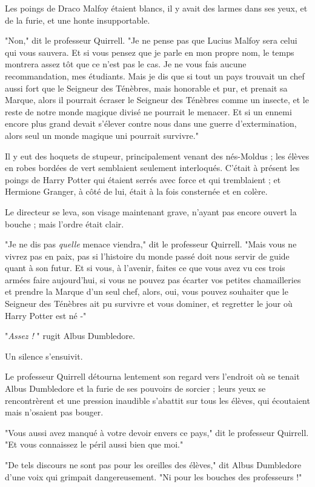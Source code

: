 Les poings de Draco Malfoy étaient blancs, il y avait des larmes dans ses yeux, et de la furie, et une honte insupportable.

"Non," dit le professeur Quirrell. "Je ne pense pas que Lucius Malfoy sera celui qui vous sauvera. Et si vous pensez que je parle en mon propre nom, le temps montrera assez tôt que ce n'est pas le cas. Je ne vous fais aucune recommandation, mes étudiants. Mais je dis que si tout un pays trouvait un chef aussi fort que le Seigneur des Ténèbres, mais honorable et pur, et prenait sa Marque, alors il pourrait écraser le Seigneur des Ténèbres comme un insecte, et le reste de notre monde magique divisé ne pourrait le menacer. Et si un ennemi encore plus grand devait s'élever contre nous dans une guerre d'extermination, alors seul un monde magique uni pourrait survivre."

Il y eut des hoquets de stupeur, principalement venant des nés-Moldus ; les élèves en robes bordées de vert semblaient seulement interloqués. C'était à présent les poings de Harry Potter qui étaient serrés avec force et qui tremblaient ; et Hermione Granger, à côté de lui, était à la fois consternée et en colère.

Le directeur se leva, son visage maintenant grave, n'ayant pas encore ouvert la bouche ; mais l'ordre était clair.

"Je ne dis pas \emph{quelle}  menace viendra," dit le professeur Quirrell. "Mais vous ne vivrez pas en paix, pas si l'histoire du monde passé doit nous servir de guide quant à son futur. Et si vous, à l'avenir, faites ce que vous avez vu ces trois armées faire aujourd'hui, si vous ne pouvez pas écarter vos petites chamailleries et prendre la Marque d'un seul chef, alors, oui, vous pouvez souhaiter que le Seigneur des Ténèbres ait pu survivre et vous dominer, et regretter le jour où Harry Potter est né -"

"\emph{Assez !} " rugit Albus Dumbledore.

Un silence s'ensuivit.

Le professeur Quirrell détourna lentement son regard vers l'endroit où se tenait Albus Dumbledore et la furie de ses pouvoirs de sorcier ; leurs yeux se rencontrèrent et une pression inaudible s'abattit sur tous les élèves, qui écoutaient mais n'osaient pas bouger.

"Vous aussi avez manqué à votre devoir envers ce pays," dit le professeur Quirrell. "Et vous connaissez le péril aussi bien que moi."

"De tels discours ne sont pas pour les oreilles des élèves," dit Albus Dumbledore d'une voix qui grimpait dangereusement. "Ni pour les bouches des professeurs !"

